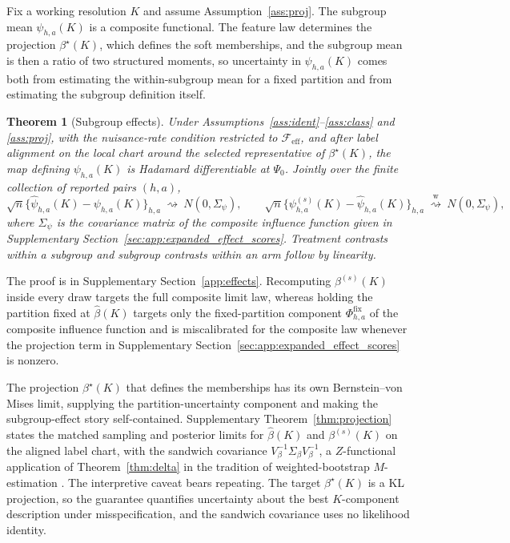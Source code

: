 \documentclass[11pt]{article}
\newtheorem{theorem}{Theorem}%
\newcommand{\dto}{\rightsquigarrow}
\newcommand{\dtow}{\overset{\mathrm w}{\rightsquigarrow}}
\newcommand{\calF}{\mathcal F}
\begin{document}
Fix a working resolution $K$ and assume Assumption~\ref{ass:proj}. The subgroup mean $\psi_{h,a}(K)$ is a composite functional. The feature law determines the projection $\beta^\star(K)$, which defines the soft memberships, and the subgroup mean is then a ratio of two structured moments, so uncertainty in $\psi_{h,a}(K)$ comes both from estimating the within-subgroup mean for a fixed partition and from estimating the subgroup definition itself.

\begin{theorem}[Subgroup effects]\label{thm:effects}
Under Assumptions~\ref{ass:ident}--\ref{ass:class} and \ref{ass:proj}, with the nuisance-rate condition restricted to $\calF_{\mathrm{eff}}$, and after label alignment on the local chart around the selected representative of $\beta^\star(K)$, the map defining $\psi_{h,a}(K)$ is Hadamard differentiable at $\Psi_0$.  Jointly over the finite collection of reported pairs $(h,a)$,
\[
\sqrt n\{\hat\psi_{h,a}(K)-\psi_{h,a}(K)\}_{h,a}
\ \dto\
N(0,\Sigma_\psi),
\qquad
\sqrt n\{\psi^{(s)}_{h,a}(K)-\hat\psi_{h,a}(K)\}_{h,a}
\ \dtow\
N(0,\Sigma_\psi),
\]
where $\Sigma_\psi$ is the covariance matrix of the composite influence function given in Supplementary Section~\ref{sec:app:expanded_effect_scores}.  Treatment contrasts within a subgroup and subgroup contrasts within an arm follow by linearity.
\end{theorem}
The proof is in Supplementary Section~\ref{app:effects}. Recomputing $\beta^{(s)}(K)$ inside every draw targets the full composite limit law, whereas holding the partition fixed at $\hat\beta(K)$ targets only the fixed-partition component $\Phi^{\mathrm{fix}}_{h,a}$ of the composite influence function and is miscalibrated for the composite law whenever the projection term in Supplementary Section~\ref{sec:app:expanded_effect_scores} is nonzero.

The projection $\beta^\star(K)$ that defines the memberships has its own Bernstein--von Mises limit, supplying the partition-uncertainty component and making the subgroup-effect story self-contained. Supplementary Theorem~\ref{thm:projection} states the matched sampling and posterior limits for $\hat\beta(K)$ and $\beta^{(s)}(K)$ on the aligned label chart, with the sandwich covariance $V_\beta^{-1}\Sigma_\beta V_\beta^{-1}$, a $Z$-functional application of Theorem~\ref{thm:delta} in the tradition of weighted-bootstrap $M$-estimation \citep{ma2005,cheng2010}. The interpretive caveat bears repeating. The target $\beta^\star(K)$ is a KL projection, so the guarantee quantifies uncertainty about the best $K$-component description under misspecification, and the sandwich covariance uses no likelihood identity.
\end{document}
